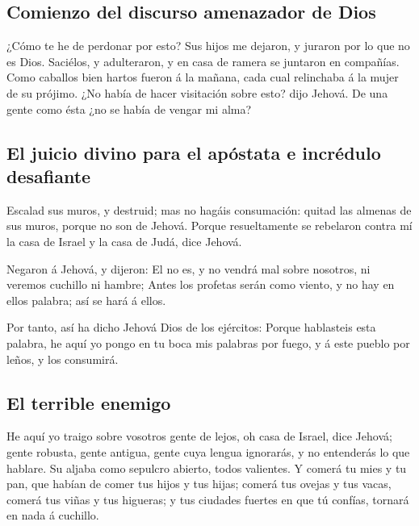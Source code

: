 \hypertarget{comienzo-del-discurso-amenazador-de-dios}{%
\subsection{Comienzo del discurso amenazador de
Dios}\label{comienzo-del-discurso-amenazador-de-dios}}

 ¿Cómo te he de perdonar por esto? Sus hijos me dejaron, y
juraron por lo que no es Dios. Saciélos, y adulteraron, y en casa de
ramera se juntaron en compañías.  Como caballos bien hartos
fueron á la mañana, cada cual relinchaba á la mujer de su prójimo.
 ¿No había de hacer visitación sobre esto? dijo Jehová. De
una gente como ésta ¿no se había de vengar mi alma?

\hypertarget{el-juicio-divino-para-el-apuxf3stata-e-incruxe9dulo-desafiante}{%
\subsection{El juicio divino para el apóstata e incrédulo
desafiante}\label{el-juicio-divino-para-el-apuxf3stata-e-incruxe9dulo-desafiante}}

 Escalad sus muros, y destruid; mas no hagáis consumación:
quitad las almenas de sus muros, porque no son de Jehová. 
Porque resueltamente se rebelaron contra mí la casa de Israel y la casa
de Judá, dice Jehová.

 Negaron á Jehová, y dijeron: El no es, y no vendrá mal
sobre nosotros, ni veremos cuchillo ni hambre;  Antes los
profetas serán como viento, y no hay en ellos palabra; así se hará á
ellos.

 Por tanto, así ha dicho Jehová Dios de los ejércitos:
Porque hablasteis esta palabra, he aquí yo pongo en tu boca mis palabras
por fuego, y á este pueblo por leños, y los consumirá.

\hypertarget{el-terrible-enemigo}{%
\subsection{El terrible enemigo}\label{el-terrible-enemigo}}

 He aquí yo traigo sobre vosotros gente de lejos, oh casa
de Israel, dice Jehová; gente robusta, gente antigua, gente cuya lengua
ignorarás, y no entenderás lo que hablare.  Su aljaba como
sepulcro abierto, todos valientes.  Y comerá tu mies y tu
pan, que habían de comer tus hijos y tus hijas; comerá tus ovejas y tus
vacas, comerá tus viñas y tus higueras; y tus ciudades fuertes en que tú
confías, tornará en nada á cuchillo.

